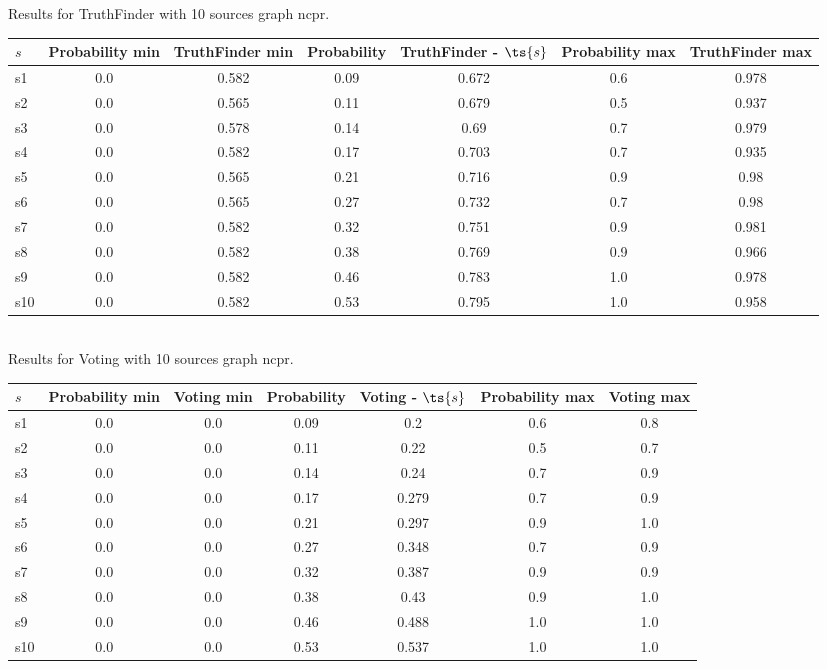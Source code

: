 \documentclass{article}
\begin{document}
\noindent Results for TruthFinder with 10 sources graph ncpr.

\noindent\begin{tabular}{|l|c|c|c|c|c|c|}
\hline
$s$& Probability min & TruthFinder min & Probability & TruthFinder - $\ts{s}$ & Probability max & TruthFinder max\\
\hline
s1 &0.0 & 0.582 & 0.09 & 0.672 & 0.6 & 0.978\\
\hline
s2 &0.0 & 0.565 & 0.11 & 0.679 & 0.5 & 0.937\\
\hline
s3 &0.0 & 0.578 & 0.14 & 0.69 & 0.7 & 0.979\\
\hline
s4 &0.0 & 0.582 & 0.17 & 0.703 & 0.7 & 0.935\\
\hline
s5 &0.0 & 0.565 & 0.21 & 0.716 & 0.9 & 0.98\\
\hline
s6 &0.0 & 0.565 & 0.27 & 0.732 & 0.7 & 0.98\\
\hline
s7 &0.0 & 0.582 & 0.32 & 0.751 & 0.9 & 0.981\\
\hline
s8 &0.0 & 0.582 & 0.38 & 0.769 & 0.9 & 0.966\\
\hline
s9 &0.0 & 0.582 & 0.46 & 0.783 & 1.0 & 0.978\\
\hline
s10 &0.0 & 0.582 & 0.53 & 0.795 & 1.0 & 0.958\\
\hline
\end{tabular}\\

\noindent Results for Voting with 10 sources graph ncpr.

\noindent\begin{tabular}{|l|c|c|c|c|c|c|}
\hline
$s$& Probability min & Voting min & Probability & Voting - $\ts{s}$ & Probability max & Voting max\\
\hline
s1 &0.0 & 0.0 & 0.09 & 0.2 & 0.6 & 0.8\\
\hline
s2 &0.0 & 0.0 & 0.11 & 0.22 & 0.5 & 0.7\\
\hline
s3 &0.0 & 0.0 & 0.14 & 0.24 & 0.7 & 0.9\\
\hline
s4 &0.0 & 0.0 & 0.17 & 0.279 & 0.7 & 0.9\\
\hline
s5 &0.0 & 0.0 & 0.21 & 0.297 & 0.9 & 1.0\\
\hline
s6 &0.0 & 0.0 & 0.27 & 0.348 & 0.7 & 0.9\\
\hline
s7 &0.0 & 0.0 & 0.32 & 0.387 & 0.9 & 0.9\\
\hline
s8 &0.0 & 0.0 & 0.38 & 0.43 & 0.9 & 1.0\\
\hline
s9 &0.0 & 0.0 & 0.46 & 0.488 & 1.0 & 1.0\\
\hline
s10 &0.0 & 0.0 & 0.53 & 0.537 & 1.0 & 1.0\\
\hline
\end{tabular}\\
\end{document}
